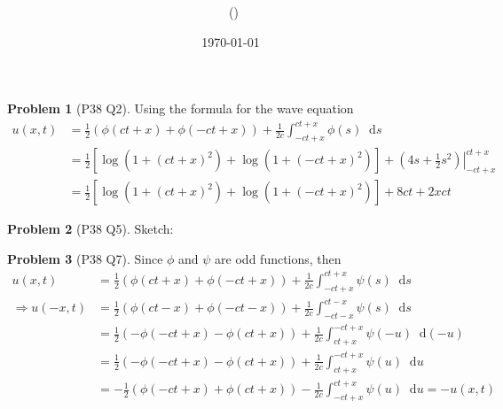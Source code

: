 \documentclass[twoside,11pt]{article}
\title{{\sffamily \Code \ \Ass}}
\author{\sffamily \name \ (\href{mailto:\mail}{\mail})}
\date{\sffamily \today}
\makeatletter
\renewcommand*\d{\mathop{}\!\mathrm{d}}
\theoremstyle{definition}
\newtheorem{problem}{Problem}
\theoremstyle{remark}
\newtheorem*{remark}{Remark}
\renewcommand{\maketitle}{\bgroup\setlength{\parindent}{0pt}
\begin{flushleft}
  \textbf{\Large\@title}

  \@author
\end{flushleft}\egroup
}
\makeatother
\begin{document}
\maketitle
\thispagestyle{title}


\begin{problem}[P38 Q2]
Using the formula for the wave equation
\begin{align*}
    u(x,t) &= \frac{1}{2}(\phi(ct+x) + \phi(-ct+x)) + \frac{1}{2c}\int_{-ct+x}^{ct+x} \phi(s)\d s\\
    &= \frac{1}{2}[\log(1+(ct+x)^2) + \log(1+(-ct+x)^2)] + \left. (4s+\frac{1}{2}s^2) \right |_{-ct+x}^{ct+x}\\
    &= \frac{1}{2}[\log(1+(ct+x)^2) + \log(1+(-ct+x)^2)] + 8ct + 2xct
\end{align*}
\end{problem}

\begin{problem}[P38 Q5]
Sketch:
\begin{figure}[H]
    \centering
    \resizebox{0.6\textwidth}{!}{}
\end{figure}
\end{problem}

\begin{problem}[P38 Q7]
Since $\phi$ and $\psi$ are odd functions, then
\begin{align*}
    u(x,t) &= \frac{1}{2}(\phi(ct+x) + \phi(-ct+x)) + \frac{1}{2c}\int_{-ct+x}^{ct+x} \psi(s)\d s\\
    \Rightarrow u(-x,t) &=
    \frac{1}{2}(\phi(ct-x) + \phi(-ct-x))
    +\frac{1}{2c}\int_{-ct-x}^{ct-x}\psi(s)\d s\\
    &= \frac{1}{2}(-\phi(-ct+x) - \phi(ct+x)) + 
    \frac{1}{2c}\int_{ct+x}^{-ct+x}\psi(-u)\d (-u)\\
    &= \frac{1}{2}(-\phi(-ct+x) - \phi(ct+x)) + 
    \frac{1}{2c}\int_{ct+x}^{-ct+x}\psi(u)\d u\\
    &= -\frac{1}{2}(\phi(-ct+x) + \phi(ct+x)) -
    \frac{1}{2c}\int_{-ct+x}^{ct+x}\psi(u)\d u = -u(x,t)
\end{align*}
\end{problem}
\end{document}
